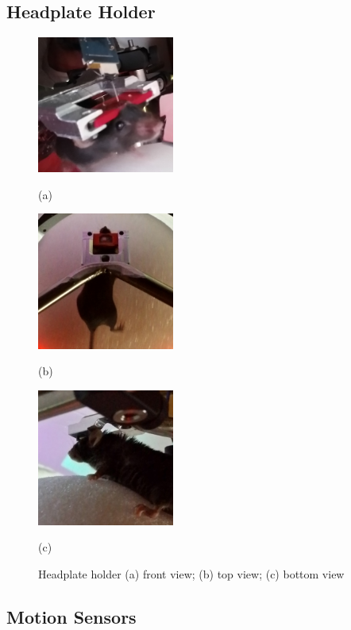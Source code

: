 \subsection{
	Headplate Holder}\label{headplate-holder} 

\begin{figure}[htb]
	\begin{minipage}[t]{0.32\linewidth}\centering \includegraphics[width=4.5cm]{photo-front.jpg} \centerline{(a)}
	\end{minipage}
	\hfill
	\begin{minipage}[t]{0.32\linewidth}\centering \includegraphics[width=4.5cm]{photo-top.jpg} \centerline{(b)}
	\end{minipage}
	\begin{minipage}[t]{0.32\linewidth}\centering \includegraphics[width=4.5cm]{photo-bottom.jpg} \centerline{(c)}
	\end{minipage}
	\caption{Headplate holder (a) front view;
		(b) top view; (c) bottom view}
	\label{fig:Spherical treadmill}
\end{figure}

\subsection{
	Motion Sensors}\label{motion-sensors} 

